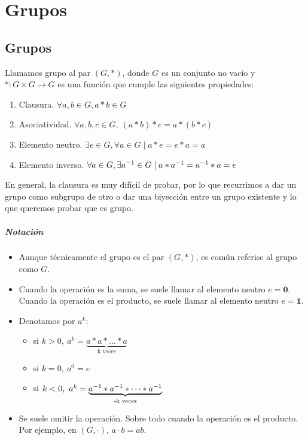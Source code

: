 \chapter{Grupos}

\section{Grupos}

\begin{dfn}[Grupo]
	Llamamos grupo al par $(G, \ast)$, donde $G$ es un conjunto no vacío y $\ast: G \times G \to G$ es una función que cumple las siguientes propiedades:
	\begin{enumerate}
		\item Clausura. $\forall a, b \in G, a \ast b \in G$
		\item Asociatividad. $\forall a, b, c \in G,\ (a \ast b) \ast c = a \ast (b \ast c)$
		\item Elemento neutro. $\exists e \in G, \forall a \in G \mid a \ast e = e \ast a = a$
		\item Elemento inverso. $\forall a \in G, \exists a^{-1} \in G \mid a \ast a^{-1} = a^{-1} \ast a = e$
	\end{enumerate}
\end{dfn}

En general, la clausura es muy difícil de probar, por lo que recurrimos a dar un grupo como subgrupo de otro o dar una biyección entre un grupo existente y lo que queremos probar que es grupo.

\paragraph{Notación}

\begin{itemize}
	\item Aunque técnicamente el grupo es el par $(G, \ast)$, es común referise al grupo como $G$.
	\item Cuando la operación es la suma, se suele llamar al elemento neutro $e = \mathbf{0}$. Cuando la operación es el producto, se suele llamar al elemento neutro $e = \mathbf{1}$.
	\item Denotamos por $a^k$:
	\begin{itemize}
		\item si $k > 0,\ a^k = \underbrace{a \ast a \ast \dots \ast a}_\text{k veces}$
		\item si $k = 0,\ a^0 = e$
		\item si $k < 0,\ a^k = \underbrace{a^{-1} \ast a^{-1} \ast \dots \ast a^{-1}}_\text{-k veces}$
	\end{itemize}
	\item Se suele omitir la operación. Sobre todo cuando la operación es el producto. Por ejemplo, en $(G, \cdot)$, $a \cdot b = ab$.
\end{itemize}

